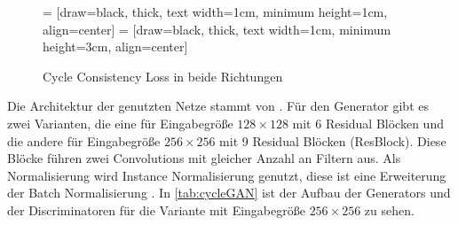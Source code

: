  \begin{figure}
 
 	 = [draw=black, thick, text width=1cm, minimum height=1cm, align=center]  
 	 = [draw=black, thick, text width=1cm, minimum height=3cm, align=center]  
 	\caption[cycle consistency loss]{Cycle Consistency Loss in beide Richtungen}
 	\label{fig:cylce_loss}
 \end{figure}
 
 Die Architektur der genutzten Netze stammt von \citeauthor{johnson_perceptual_2016} \cite{johnson_perceptual_2016}. Für den Generator gibt es zwei Varianten, die eine für Eingabegröße $128 \times 128$ mit 6 Residual Blöcken und die andere für Eingabegröße $256 \times 256$ mit 9 Residual Blöcken (ResBlock). Diese Blöcke führen zwei Convolutions mit gleicher Anzahl an Filtern aus. Als Normalisierung wird Instance Normalisierung genutzt, diese ist eine Erweiterung der Batch Normalisierung \cite{ulyanov_instance_2016}. In \cref{tab:cycleGAN} ist der Aufbau der Generators und der Discriminatoren für die Variante mit Eingabegröße $256 \times 256$ zu sehen.
 
